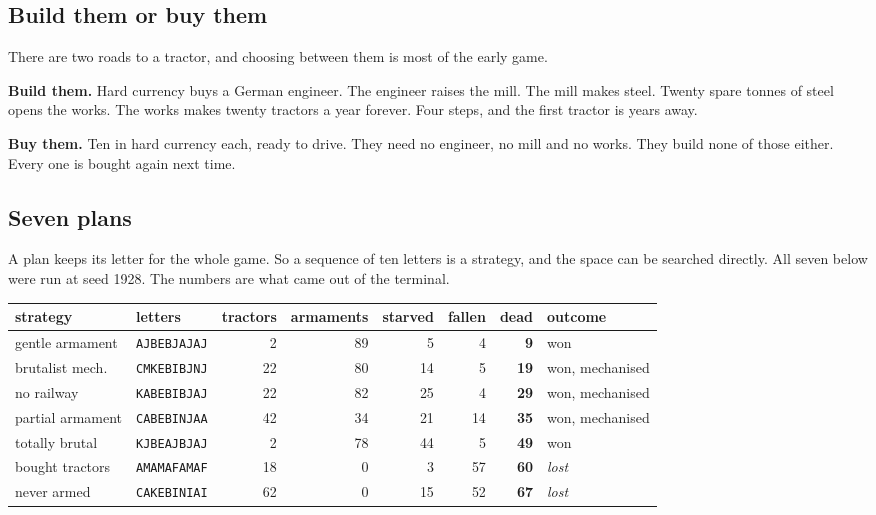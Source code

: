 \documentclass[11pt,a4paper]{article}
\begin{document}
\subsection{Build them or buy them}

There are two roads to a tractor, and choosing between them is most of the early game.

\textbf{Build them.} Hard currency buys a German engineer. The engineer raises the mill. The mill
makes steel. Twenty spare tonnes of steel opens the works. The works makes twenty tractors a year
forever. Four steps, and the first tractor is years away.

\textbf{Buy them.} Ten in hard currency each, ready to drive. They need no engineer, no mill and no
works. They build none of those either. Every one is bought again next time.

\subsection{Seven plans}

A plan keeps its letter for the whole game. So a sequence of ten letters is a strategy, and the
space can be searched directly. All seven below were run at seed 1928. The numbers are what came
out of the terminal.

\begin{center}\small
\begin{tabular}{@{}llrrrrrl@{}}
\toprule
strategy & letters & tractors & armaments & starved & fallen & \textbf{dead} & outcome \\
\midrule
gentle armament   & \texttt{AJBEBJAJAJ} &  2 & 89 &  5 &  4 & \textbf{9}  & won \\
brutalist mech.   & \texttt{CMKEBIBJNJ} & 22 & 80 & 14 &  5 & \textbf{19} & won, mechanised \\
no railway        & \texttt{KABEBIBJAJ} & 22 & 82 & 25 &  4 & \textbf{29} & won, mechanised \\
partial armament  & \texttt{CABEBINJAA} & 42 & 34 & 21 & 14 & \textbf{35} & won, mechanised \\
totally brutal    & \texttt{KJBEAJBJAJ} &  2 & 78 & 44 &  5 & \textbf{49} & won \\
bought tractors   & \texttt{AMAMAFAMAF} & 18 &  0 &  3 & 57 & \textbf{60} & \emph{lost} \\
never armed       & \texttt{CAKEBINIAI} & 62 &  0 & 15 & 52 & \textbf{67} & \emph{lost} \\
\bottomrule
\end{tabular}
\end{center}
\end{document}
